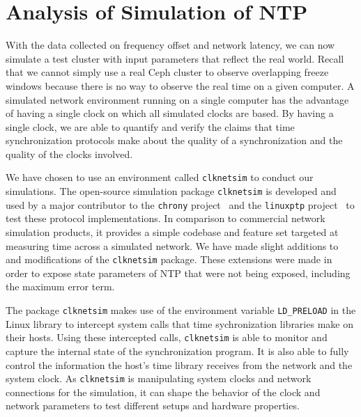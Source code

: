         



\section{Analysis of Simulation of NTP}

With the data collected on frequency offset and network latency, we
can now simulate a test cluster with input parameters that reflect the
real world. Recall that we cannot simply use a real Ceph
cluster to observe overlapping freeze windows because there is no
way to observe the real time on a given computer. A simulated network
environment running on a single computer has the advantage of having a
single clock on which all simulated clocks are based. By having a
single clock, we are able to quantify and verify the claims that time
synchronization protocols make about the quality of a synchronization
and the quality of the clocks involved.

We have chosen to use an environment called
\texttt{clknetsim} %
to conduct our simulations. The open-source simulation package
\texttt{clknetsim} is developed and used by a major contributor to the
\texttt{chrony} project~\citep{chrony} and the \texttt{linuxptp}
project~\citep{linuxptp} to test these protocol implementations. In
comparison to commercial network simulation products, it provides a
simple codebase and feature set targeted at measuring time across a
simulated network. We have made slight additions to and modifications
of the \texttt{clknetsim} package. These extensions were made in order
to expose state parameters of NTP that were not being exposed,
including the maximum error term.

The package \texttt{clknetsim} makes use of the environment variable
\texttt{LD\_PRELOAD} in the Linux library to intercept system calls
that time sychronization libraries make on their hosts. Using these
intercepted calls, \texttt{clknetsim} is able to monitor and capture
the internal state of the synchronization program. It is also able to
fully control the information the host's time library receives from
the network and the system clock. As \texttt{clknetsim} is
manipulating system clocks and network connections for the simulation,
it can shape the behavior of the clock and network parameters to test
different setups and hardware properties.

